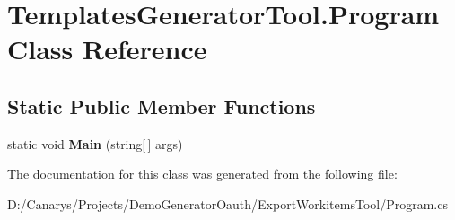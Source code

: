 \hypertarget{class_templates_generator_tool_1_1_program}{}\section{Templates\+Generator\+Tool.\+Program Class Reference}
\label{class_templates_generator_tool_1_1_program}
\subsection*{Static Public Member Functions}
\begin{DoxyCompactItemize}
\item 
\mbox{\label{class_templates_generator_tool_1_1_program_a6a9125dac357bdc201a9cb7f3fc72710}} 
static void {\bfseries Main} (string\mbox{[}$\,$\mbox{]} args)
\end{DoxyCompactItemize}


The documentation for this class was generated from the following file\+:\begin{DoxyCompactItemize}
\item 
D\+:/\+Canarys/\+Projects/\+Demo\+Generator\+Oauth/\+Export\+Workitems\+Tool/Program.\+cs\end{DoxyCompactItemize}
